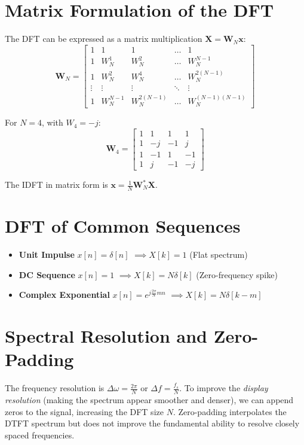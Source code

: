 \documentclass[11pt,a4paper]{article}
\begin{document}
\section{Matrix Formulation of the DFT}
The DFT can be expressed as a matrix multiplication $\mathbf{X} = \mathbf{W}_N \mathbf{x}$:
\begin{equation}
\mathbf{W}_N = \begin{bmatrix}
1 & 1 & 1 & \dots & 1 \\
1 & W_N^1 & W_N^2 & \dots & W_N^{N-1} \\
1 & W_N^2 & W_N^4 & \dots & W_N^{2(N-1)} \\
\vdots & \vdots & \vdots & \ddots & \vdots \\
1 & W_N^{N-1} & W_N^{2(N-1)} & \dots & W_N^{(N-1)(N-1)}
\end{bmatrix}
\end{equation}

For $N=4$, with $W_4 = -j$:
\begin{equation}
\mathbf{W}_4 = \begin{bmatrix}
1 & 1 & 1 & 1 \\
1 & -j & -1 & j \\
1 & -1 & 1 & -1 \\
1 & j & -1 & -j
\end{bmatrix}
\end{equation}

The IDFT in matrix form is $\mathbf{x} = \frac{1}{N} \mathbf{W}_N^* \mathbf{X}$.

\section{DFT of Common Sequences}
\begin{itemize}
    \item \textbf{Unit Impulse} $x[n] = \delta[n]$ $\implies X[k] = 1$ (Flat spectrum)
    \item \textbf{DC Sequence} $x[n] = 1$ $\implies X[k] = N \delta[k]$ (Zero-frequency spike)
    \item \textbf{Complex Exponential} $x[n] = e^{j\frac{2\pi}{N} m n}$ $\implies X[k] = N \delta[k-m]$
\end{itemize}

\section{Spectral Resolution and Zero-Padding}
The frequency resolution is $\Delta \omega = \frac{2\pi}{N}$ or $\Delta f = \frac{f_s}{N}$. To improve the \textit{display resolution} (making the spectrum appear smoother and denser), we can append zeros to the signal, increasing the DFT size $N$. Zero-padding interpolates the DTFT spectrum but does not improve the fundamental ability to resolve closely spaced frequencies.
\end{document}
